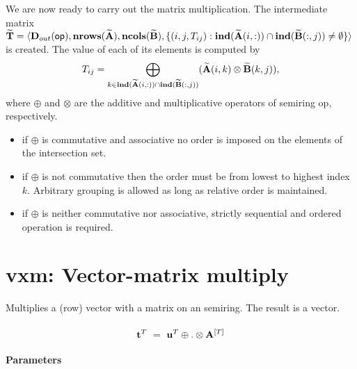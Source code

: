 
We are now ready to carry out the matrix multiplication.
The intermediate matrix \\
${\bf \widetilde{T}} = \langle
\mbox{$\mathbf{D}_{out}$}({\sf op}), \bold{nrows}({\bf \widetilde{A}}), \bold{ncols}({\bf \widetilde{B}}),
\{(i,j,T_{ij}) : \bold{ind}({\bf \widetilde{A}}(i,:)) \cap
\bold{ind}({\bf \widetilde{B}}(:,j)) \neq \emptyset \} \rangle$
is created.  The value of each of its elements is computed by 
\[T_{ij} = \bigoplus_{k \in \bold{ind}({\bf \widetilde{A}}(i,:)) \cap
\bold{ind}({\bf \widetilde{B}}(:,j))} ({\bf \widetilde{A}}(i,k)
\otimes {\bf \widetilde{B}}(k,j)),\] where $\oplus$ and $\otimes$
are the additive and multiplicative operators of semiring {\sf op},
respectively.

\begin{itemize}
\item if $\oplus$ is commutative and associative no order is imposed on the elements of the intersection set.
\item if $\oplus$ is not commutative then the order must be from lowest to highest index $k$. Arbitrary grouping is allowed as long as relative order is maintained.
\item if $\oplus$ is neither commutative nor associative, strictly sequential and ordered operation is required.
\end{itemize}


\section{{\sf vxm}: Vector-matrix multiply}

Multiplies a (row) vector with a matrix on an semiring. The result is a vector.

\paragraph{\syntax}

$$
{\bf t}^T ~ = ~ {\bf u}^{T} \oplus.\otimes {\bf A}^{[T]}
$$

\paragraph{Parameters}

